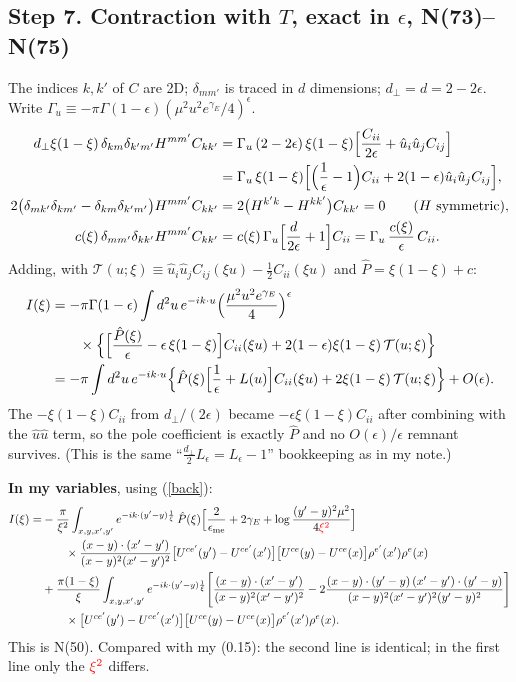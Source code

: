 \documentclass[10pt]{article}
\numberwithin{equation}{section}
\newcommand{\Wop}[2]{\big[U^{ce'}(#2)-U^{ce'}(x')\big]\big[U^{ce}(#1)-U^{ce}(x)\big]\rho^{e'}(x')\rho^{e}(x)}
\newcommand{\Kx}[2]{\frac{(x-#1)\cdot(x'-#2)}{(x-#1)^{2}(x'-#2)^{2}}}
\newcommand{\Ph}{\hat P}
\newcommand{\Tc}{\mathcal T}
\newcommand{\red}[1]{{\color{red}#1}}
\begin{document}
\subsection*{Step 7. Contraction with $T$, exact in $\epsilon$, N(73)--N(75)}
The indices $k,k'$ of $C$ are 2D; $\delta_{mm'}$ is traced in $d$ dimensions; $d_\perp=d=2-2\epsilon$. Write
$\Gamma_u\equiv-\pi\Gamma(1-\epsilon)(\mu^2u^2e^{\gamma_E}/4)^\epsilon$.
\begin{align}
d_\perp\xi(1-\xi)\,\delta_{km}\delta_{k'm'}H^{mm'}C_{kk'}&=\Gamma_u\,(2-2\epsilon)\,\xi(1-\xi)\Big[\frac{C_{ii}}{2\epsilon}+\hat u_i\hat u_jC_{ij}\Big]\notag\\
&=\Gamma_u\,\xi(1-\xi)\Big[\Big(\frac1\epsilon-1\Big)C_{ii}+2(1-\epsilon)\hat u_i\hat u_jC_{ij}\Big],\\
2\big(\delta_{mk'}\delta_{km'}-\delta_{km}\delta_{k'm'}\big)H^{mm'}C_{kk'}&=2\big(H^{k'k}-H^{kk'}\big)C_{kk'}=0\qquad(H\ \text{symmetric}),\\
c(\xi)\,\delta_{mm'}\delta_{kk'}H^{mm'}C_{kk'}&=c(\xi)\,\Gamma_u\Big[\frac{d}{2\epsilon}+1\Big]C_{ii}=\Gamma_u\,\frac{c(\xi)}{\epsilon}\,C_{ii}.
\end{align}
Adding, with $\Tc(u;\xi)\equiv\hat u_i\hat u_jC_{ij}(\xi u)-\frac12C_{ii}(\xi u)$ and $\Ph=\xi(1-\xi)+c$:
\begin{align}
I(\xi)&=-\pi\Gamma(1-\epsilon)\int d^2u\,e^{-ik\cdot u}\Big(\frac{\mu^2u^2e^{\gamma_E}}{4}\Big)^\epsilon\notag\\
&\qquad\times\Big\{\Big[\frac{\Ph(\xi)}{\epsilon}-\epsilon\,\xi(1-\xi)\Big]C_{ii}(\xi u)+2(1-\epsilon)\xi(1-\xi)\,\Tc(u;\xi)\Big\}\\
&=-\pi\int d^2u\,e^{-ik\cdot u}\Big\{\Ph(\xi)\Big[\frac1\epsilon+L(u)\Big]C_{ii}(\xi u)+2\xi(1-\xi)\,\Tc(u;\xi)\Big\}+O(\epsilon).\label{Iu}
\end{align}
The $-\xi(1-\xi)C_{ii}$ from $d_\perp/(2\epsilon)$ became $-\epsilon\xi(1-\xi)C_{ii}$ after combining with the
$\hat u\hat u$ term, so the pole coefficient is exactly $\Ph$ and no $O(\epsilon)/\epsilon$ remnant survives.
(This is the same ``$\frac{d_\perp}{2}L_\epsilon=L_\epsilon-1$'' bookkeeping as in my note.)

\textbf{In my variables}, using (\ref{back}):
\begin{align}
I(\xi)=&-\frac{\pi}{\xi^2}\int_{x,y,x',y'}e^{-ik\cdot(y'-y)\frac1\xi}\,\Ph(\xi)\Big[\frac{2}{\epsilon_{\rm me}}+2\gamma_E+\log\frac{(y'-y)^2\mu^2}{4\red{\xi^2}}\Big]\notag\\
&\qquad\times\Kx{y}{y'}\Wop{y}{y'}\notag\\
&+\frac{\pi(1-\xi)}{\xi}\int_{x,y,x',y'}e^{-ik\cdot(y'-y)\frac1\xi}\Bigg[\Kx{y}{y'}-2\frac{(x-y)\cdot(y'-y)\,(x'-y')\cdot(y'-y)}{(x-y)^2(x'-y')^2(y'-y)^2}\Bigg]\notag\\
&\qquad\times\Wop{y}{y'}.\label{Iy}
\end{align}
This is N(50). Compared with my (0.15): the second line is identical; in the first line only the $\red{\xi^2}$ differs.
\end{document}
